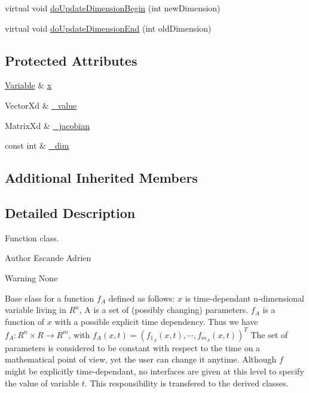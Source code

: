 {\bf }\par
\begin{DoxyCompactItemize}
\item 
virtual void \hyperlink{classocra_1_1Function_afdf98e9f43fde97a5256af88a50cbb39}{do\+Update\+Dimension\+Begin} (int new\+Dimension)
\item 
virtual void \hyperlink{classocra_1_1Function_a17aa280f0e6eff4a7569edc373a5147d}{do\+Update\+Dimension\+End} (int old\+Dimension)
\end{DoxyCompactItemize}

\subsection*{Protected Attributes}
\begin{DoxyCompactItemize}
\item 
\hyperlink{classocra_1_1Variable}{Variable} \& \hyperlink{classocra_1_1Function_a28825886d1f149c87b112ec2ec1dd486}{x}
\item 
Vector\+Xd \& \hyperlink{classocra_1_1Function_adf9ae8a4ca631a787c99c4b499bea094}{\+\_\+value}
\item 
Matrix\+Xd \& \hyperlink{classocra_1_1Function_ade18c5f3f678fe0245dfc397e99112dc}{\+\_\+jacobian}
\item 
const int \& \hyperlink{classocra_1_1Function_a1b5d0dcebb8b435c7a5e70f8e6fbafcc}{\+\_\+dim}
\end{DoxyCompactItemize}
\subsection*{Additional Inherited Members}


\subsection{Detailed Description}
Function class. 

\begin{DoxyAuthor}{Author}
Escande Adrien 
\end{DoxyAuthor}
\begin{DoxyWarning}{Warning}
None
\end{DoxyWarning}
Base class for a function $ f_A $ defined as follows\+: $x$ is time-\/dependant n-\/dimensional variable living in $R^n$, A is a set of (possibly changing) parameters. $ f_A $ is a function of $x$ with a possible explicit time dependency. Thus we have $ f_A : R^n \times R \rightarrow R^m $, with $ f_A(x,t) = (f_{1_A}(x,t), \cdots, f_{m_A}(x,t))^T $ The set of parameters is considered to be constant with respect to the time on a mathematical point of view, yet the user can change it anytime. Although $ f $ might be explicitly time-\/dependant, no interfaces are given at this level to specify the value of variable $ t $. This responsibility is transfered to the derived classes.


